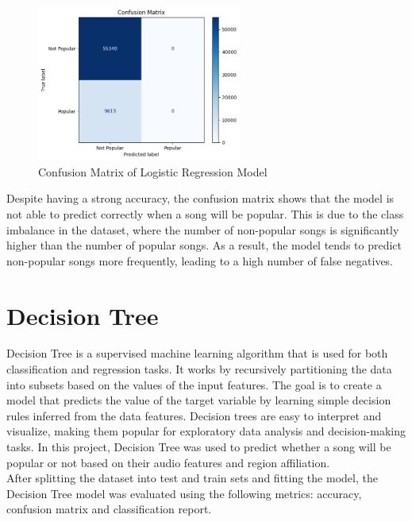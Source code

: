 \begin{figure}[h] 
    \centering 
    \includegraphics[width=0.6\textwidth]{media/log_reg_confusionmatrix.png}
    \caption{Confusion Matrix of Logistic Regression Model}

\end{figure}

Despite having a strong accuracy, the confusion matrix shows that the model is not able to predict correctly when a song will be popular. This is due to the class imbalance in the dataset, where the number of non-popular songs is significantly higher than the number of popular songs. As a result, the model tends to predict non-popular songs more frequently, leading to a high number of false negatives. 


\newpage

\section{Decision Tree}

Decision Tree is a supervised machine learning algorithm that is used for both classification and regression tasks. It works by recursively partitioning the data into subsets based on the values of the input features. The goal is to create a model that predicts the value of the target variable by learning simple decision rules inferred from the data features. Decision trees are easy to interpret and visualize, making them popular for exploratory data analysis and decision-making tasks. In this project, Decision Tree was used to predict whether a song will be popular or not based on their audio features and region affiliation. \\

After splitting the dataset into test and train sets and fitting the model, the Decision Tree model was evaluated using the following metrics: accuracy, confusion matrix and classification report.


